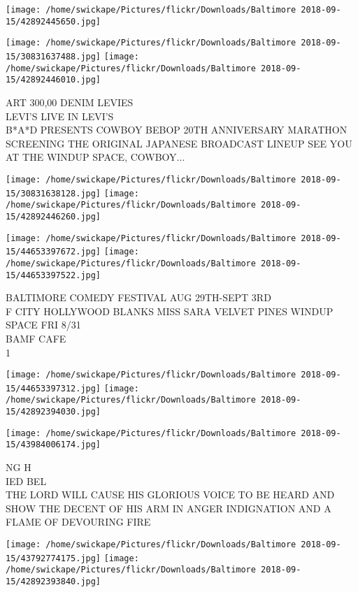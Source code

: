 \documentclass[10pt,letterpaper]{article}
\begin{document}
\texttt{[image: /home/swickape/Pictures/flickr/Downloads/Baltimore 2018-09-15/42892445650.jpg]}

\vspace{0.25in}
\texttt{[image: /home/swickape/Pictures/flickr/Downloads/Baltimore 2018-09-15/30831637488.jpg]}
\texttt{[image: /home/swickape/Pictures/flickr/Downloads/Baltimore 2018-09-15/42892446010.jpg]}

ART 300,00 DENIM LEVIES\\
LEVI'S LIVE IN LEVI'S\\
B*A*D PRESENTS COWBOY BEBOP 20TH ANNIVERSARY MARATHON SCREENING THE ORIGINAL JAPANESE BROADCAST LINEUP SEE YOU AT THE WINDUP SPACE, COWBOY...
\pagebreak

\texttt{[image: /home/swickape/Pictures/flickr/Downloads/Baltimore 2018-09-15/30831638128.jpg]}
\texttt{[image: /home/swickape/Pictures/flickr/Downloads/Baltimore 2018-09-15/42892446260.jpg]}

\texttt{[image: /home/swickape/Pictures/flickr/Downloads/Baltimore 2018-09-15/44653397672.jpg]}
\texttt{[image: /home/swickape/Pictures/flickr/Downloads/Baltimore 2018-09-15/44653397522.jpg]}

BALTIMORE COMEDY FESTIVAL AUG 29TH{-}SEPT 3RD\\
F CITY HOLLYWOOD BLANKS MISS SARA VELVET PINES WINDUP SPACE FRI 8/31\\
BAMF CAFE\\
1
\pagebreak

\texttt{[image: /home/swickape/Pictures/flickr/Downloads/Baltimore 2018-09-15/44653397312.jpg]}
\texttt{[image: /home/swickape/Pictures/flickr/Downloads/Baltimore 2018-09-15/42892394030.jpg]}

\vspace{0.25in}
\texttt{[image: /home/swickape/Pictures/flickr/Downloads/Baltimore 2018-09-15/43984006174.jpg]}

NG H\\
IED BEL\\
THE LORD WILL CAUSE HIS GLORIOUS VOICE TO BE HEARD AND SHOW THE DECENT OF HIS ARM IN ANGER INDIGNATION AND A FLAME OF DEVOURING FIRE
\pagebreak

\texttt{[image: /home/swickape/Pictures/flickr/Downloads/Baltimore 2018-09-15/43792774175.jpg]}
\texttt{[image: /home/swickape/Pictures/flickr/Downloads/Baltimore 2018-09-15/42892393840.jpg]}
\end{document}
